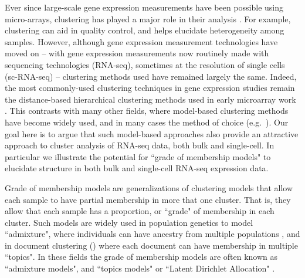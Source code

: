 Ever since large-scale gene expression measurements have been possible using micro-arrays, clustering has played a major role in their analysis \cite{Eisen1998}.
For example, clustering can aid in quality control, and helps elucidate heterogeneity among samples. However, although gene expression 
measurement technologies have moved on -- with gene expression measurements now routinely made with sequencing technologies (RNA-seq), sometimes at the resolution of single cells (sc-RNA-seq) -- clustering methods used have remained largely the same. Indeed, the most commonly-used clustering techniques in gene expression studies
remain the distance-based hierarchical clustering 
methods used in early microarray work \cite{Eisen1998}. This contrasts with many other fields, where model-based clustering methods
have become widely used, and in many cases the method of choice (e.g.~\cite{Pritchard2000}). Our goal here
is to argue that such model-based approaches also provide an attractive approach to cluster analysis of RNA-seq data, both bulk and single-cell.
In particular we illustrate the potential for ``grade of membership models" \cite{Erosheva2006} to elucidate structure in both bulk and single-cell RNA-seq expression data. 

Grade of membership models are generalizations of clustering models that allow each sample to have partial membership in more that one cluster.
That is, they allow that each sample has a proportion, or ``grade" of membership in each cluster. Such
models are widely used in population genetics to model ``admixture", where individuals can have ancestry from multiple populations \cite{Pritchard2000},
and in document clustering (\cite{Blei2003,Blei2009}) where each document can have membership in multiple ``topics". In these fields
the grade of membership models are often known as ``admixture models", and ``topics models" or ``Latent Dirichlet Allocation" \cite{Blei2003}.

